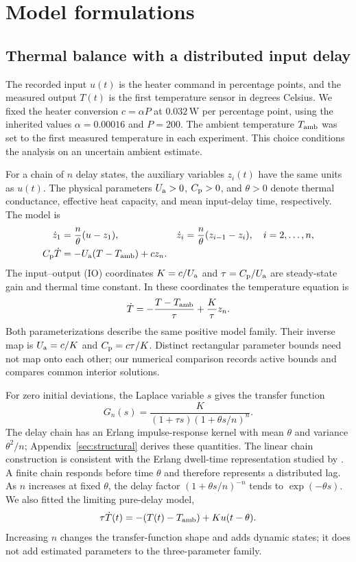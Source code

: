 \section{Model formulations}
\label{sec:models}

\subsection{Thermal balance with a distributed input delay}
The recorded input $u(t)$ is the heater command in percentage points, and the measured
output $T(t)$ is the first temperature sensor in degrees Celsius. We fixed the
heater conversion $c=\alpha P$ at $0.032\,\mathrm{W}$ per percentage point, using
the inherited values $\alpha=0.00016$ and $P=200$. The ambient temperature
$T_{\mathrm{amb}}$ was set to the first measured temperature in each experiment. This
choice conditions the analysis on an uncertain ambient estimate.

For a chain of $n$ delay states, the auxiliary variables $z_i(t)$ have the same
units as $u(t)$. The physical parameters $U_{\mathrm a}>0$, $C_{\mathrm p}>0$, and $\theta>0$
denote thermal conductance, effective heat capacity, and mean input-delay time,
respectively. The model is
\begin{align}
 \dot z_1 &= \frac{n}{\theta}(u-z_1), &
 \dot z_i &= \frac{n}{\theta}(z_{i-1}-z_i),\quad i=2,\ldots,n,\label{eq:chain}\\
 C_{\mathrm p}\dot T &= -U_{\mathrm a}(T-T_{\mathrm{amb}})+c z_n.\label{eq:physical}
\end{align}
The input--output (IO) coordinates $K=c/U_{\mathrm a}$ and $\tau=C_{\mathrm p}/U_{\mathrm a}$ are steady-state
gain and thermal time constant. In these coordinates the temperature equation is
\begin{equation}
 \dot T=-\frac{T-T_{\mathrm{amb}}}{\tau}+\frac{K}{\tau}z_n.
 \label{eq:io}
\end{equation}
Both parameterizations describe the same positive model family. Their inverse
map is $U_{\mathrm a}=c/K$ and $C_{\mathrm p}=c\tau/K$. Distinct rectangular parameter bounds need
not map onto each other; our numerical comparison records active bounds and
compares common interior solutions.

For zero initial deviations, the Laplace variable $s$ gives the transfer function
\begin{equation}
 G_n(s)=\frac{K}{(1+\tau s)(1+\theta s/n)^n}.
 \label{eq:transfer}
\end{equation}
The delay chain has an Erlang impulse-response kernel with mean $\theta$ and
variance $\theta^2/n$; Appendix~\ref{sec:structural} derives these quantities.
The linear chain construction is consistent with the Erlang dwell-time
representation studied by \citet{hurtado-2019-generalizations}. A finite chain
responds before time $\theta$ and therefore represents a distributed lag. As
$n$ increases at fixed $\theta$, the delay factor $(1+\theta s/n)^{-n}$ tends to
$\exp(-\theta s)$. We also fitted the limiting pure-delay model,
\begin{equation}
 \tau\dot T(t)=-(T(t)-T_{\mathrm{amb}})+K u(t-\theta).
 \label{eq:puredelay}
\end{equation}
Increasing $n$ changes the transfer-function shape and adds dynamic states;
it does not add estimated parameters to the three-parameter family.

